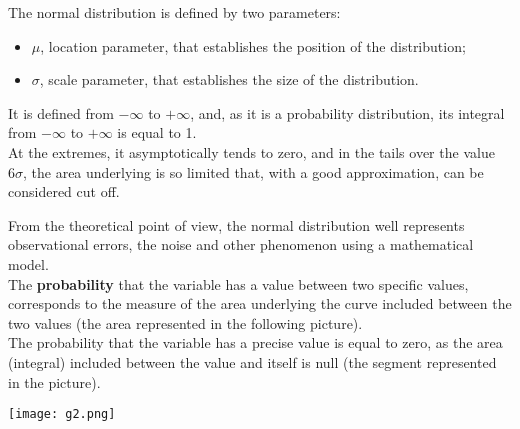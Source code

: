 \begin{frame}
  \vspace*{.5cm}
  The normal distribution is defined by two parameters:
  \begin{itemize}
    \item $ \mu $, location parameter, that establishes the position of the distribution;
    \item $ \sigma $, scale parameter, that establishes the size of the distribution.
  \end{itemize}
  \vspace*{.75cm}
  It is defined from $ -\infty $ to $ +\infty $, and, as it is a probability distribution, its integral from $ -\infty $ to $ +\infty $ is equal to 1.\\
  \vspace*{.75cm}
  At the extremes, it asymptotically tends to zero, and in the tails over the value $6\sigma$, the area underlying is so limited that, with a good approximation, can be considered cut off.
\end{frame}

\begin{frame}
  \vspace*{.5cm}
  From the theoretical point of view, the normal distribution well represents observational errors, the noise and other phenomenon using a mathematical model.\\
  \vspace*{.75cm}
  The \textbf{probability} that the variable has a value between two specific values, corresponds to the measure of the area underlying the curve included between the two values (the area represented in the following picture).\\
  \vspace*{.75cm}
  The probability that the variable has a precise value is equal to zero, as the area (integral) included between the value and itself is null (the segment represented in the picture).
\end{frame}

\begin{frame}
  \begin{center}
    \texttt{[image: g2.png]}
  \end{center}
\end{frame}

